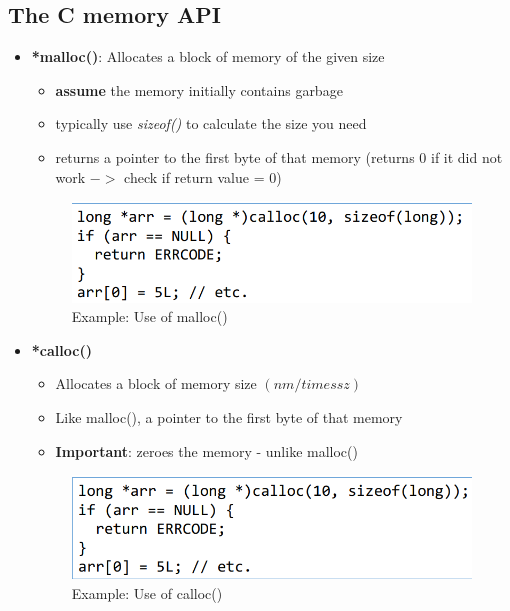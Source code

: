 \documentclass[a4paper,10pt]{article}
\begin{document}
\subsection{The C memory API}
\begin{itemize}
    \item \textbf{*malloc()}: Allocates a block of memory of the given size
    \begin{itemize}
        \item \textbf{assume} the memory initially contains garbage
        \item typically use \textit{sizeof()} to calculate the size you need
        \item returns a pointer to the first byte of that memory (returns 0 if it did not work $->$ check if return value = 0)
    \end{itemize}
    \begin{figure}[H]
        \centering
        \includegraphics[width=0.6\linewidth]{Pictures/e22.png}
        \caption{Example: Use of malloc()}
        \label{fig:enter-label}
    \end{figure}
    \pagebreak
    \item \textbf{*calloc()}
    \begin{itemize}
        \item Allocates a block of memory size $(nm /times sz)$
        \item Like malloc(), a pointer to the first byte of that memory
        \item \textbf{Important}: zeroes the memory - unlike malloc()
    \end{itemize}
    \begin{figure}[H]
        \centering
        \includegraphics[width=0.75\linewidth]{Pictures/e23.png}
        \caption{Example: Use of calloc()}
        \label{fig:enter-label}
    \end{figure}


\end{itemize}
\end{document}
